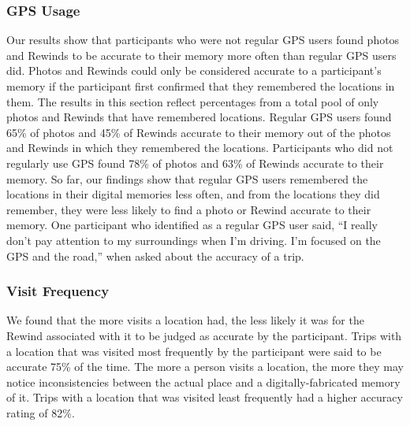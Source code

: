 \documentclass{sigchi}
\begin{document}
\subsubsection{GPS Usage}
Our results show that participants who were not regular GPS users found photos and Rewinds to be accurate to their memory more often than regular GPS users did. Photos and Rewinds could only be considered accurate to a participant's memory if the participant first confirmed that they remembered the locations in them. The results in this section reflect percentages from a total pool of only photos and Rewinds that have remembered locations. Regular GPS users found 65\% of photos and 45\% of Rewinds accurate to their memory out of the photos and Rewinds in which they remembered the locations. Participants who did not regularly use GPS found 78\% of photos and 63\% of Rewinds accurate to their memory. So far, our findings show that regular GPS users remembered the locations in their digital memories less often, and from the locations they did remember, they were less likely to find a photo or Rewind accurate to their memory. One participant who identified as a regular GPS user said, ``I really don't pay attention to my surroundings when I'm driving. I'm focused on the GPS and the road,'' when asked about the accuracy of a trip.


\subsubsection{Visit Frequency}
We found that the more visits a location had, the less likely it was for the Rewind associated with it to be judged as accurate by the participant. Trips with a location that was visited most frequently by the participant were said to be accurate 75\% of the time. The more a person visits a location, the more they may notice inconsistencies between the actual place and a digitally-fabricated memory of it. Trips with a location that was visited least frequently had a higher accuracy rating of 82\%.
\end{document}
